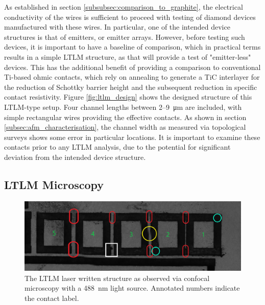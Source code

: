 \begin{refsection}
As established in section \ref{subsubsec:comparison_to_graphite}, the electrical conductivity of the wires is sufficient to proceed with testing of diamond devices manufactured with these wires. In particular, one of the intended device structures is that of emitters, or emitter arrays. However, before testing such devices, it is important to have a baseline of comparison, which in practical terms results in a simple LTLM structure, as that will provide a test of "emitter-less" devices. This has the additional benefit of providing a comparison to conventional Ti-based ohmic contacts, which rely on annealing to generate a TiC interlayer for the reduction of Schottky barrier height and the subsequent reduction in specific contact resistivity. Figure \ref{fig:ltlm_design} shows the designed structure of this LTLM-type setup. Four channel lengths between 2--9~\si{\micro\metre} are included, with simple rectangular wires providing the effective contacts. As shown in section \ref{subsec:afm_characterisation}, the channel width as measured via topological surveys shows some error in particular locations. It is important to examine these contacts prior to any LTLM analysis, due to the potential for significant deviation from the intended device structure.

\subsection{LTLM Microscopy}

\begin{figure}[H]
    \centering
    \includegraphics[width=\linewidth]{Chapter7/Figs/Raster/ltlm_esid_annotated4.jpg}
    \caption{The LTLM laser written structure as observed via confocal microscopy with a 488~\si{\nano\metre} light source. Annotated numbers indicate the contact label.}
    \label{fig:ltlm_esid}
\end{figure}


\end{refsection}
